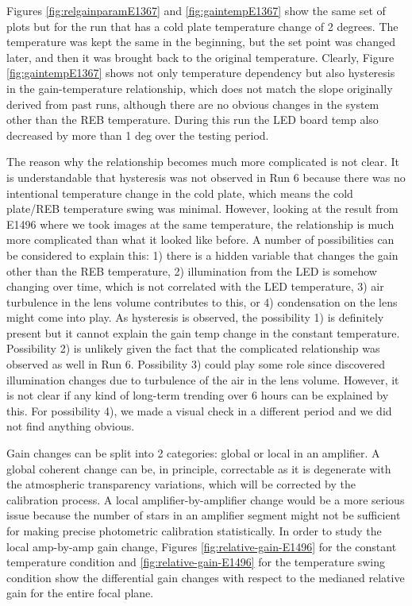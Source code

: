 Figures \ref{fig:relgainparamE1367} and \ref{fig:gaintempE1367} show the same set of plots but for the run that has a cold plate temperature change of 2 degrees.
The temperature was kept the same in the beginning, but the set point was changed later, and then it was brought back to the original temperature. 
Clearly, Figure \ref{fig:gaintempE1367} shows not only temperature dependency but also hysteresis in the gain-temperature relationship, which does not match the slope originally derived from past runs, although there are no obvious changes in the system other than the REB temperature.
During this run the LED board temp also decreased by more than 1 deg over the testing period.


The reason why the relationship becomes much more complicated is not clear. It is understandable that hysteresis was not observed in Run 6 because there was no intentional temperature change in the cold plate, which means the cold plate/REB temperature swing was minimal. However, looking at the result from E1496 where we took images at the same temperature, the relationship is much more complicated than what it looked like before. A number of possibilities can be considered to explain this: 1) there is a hidden variable that changes the gain other than the REB temperature, 2) illumination from the LED is somehow changing over time, which is not correlated with the LED temperature, 3) air turbulence in the lens volume contributes to this, or 4) condensation on the lens might come into play. As hysteresis is observed, the possibility 1) is definitely present but it cannot explain the gain temp change in the constant temperature. Possibility 2) is unlikely given the fact that the complicated relationship was observed as well in Run 6. Possibility 3) could play some role since \citet{2024arXiv241113386B} discovered illumination changes due to turbulence of the air in the lens volume. However, it is not clear if any kind of long-term trending over 6 hours can be explained by this. For possibility 4), we made a visual check in a different period and we did not find anything obvious. 

Gain changes can be split into 2 categories: global or local in an amplifier.  A global coherent change can be, in principle, correctable as it is degenerate with the atmospheric transparency variations, which will be corrected by the calibration process. A local amplifier-by-amplifier change would be a more serious issue because the number of stars in an amplifier segment might not be sufficient for making precise photometric calibration statistically. In order to study the local amp-by-amp gain change, Figures \ref{fig:relative-gain-E1496} for the constant temperature condition and \ref{fig:relative-gain-E1496} for the temperature swing condition show the differential gain changes with respect to the medianed relative gain for the entire focal plane. %

